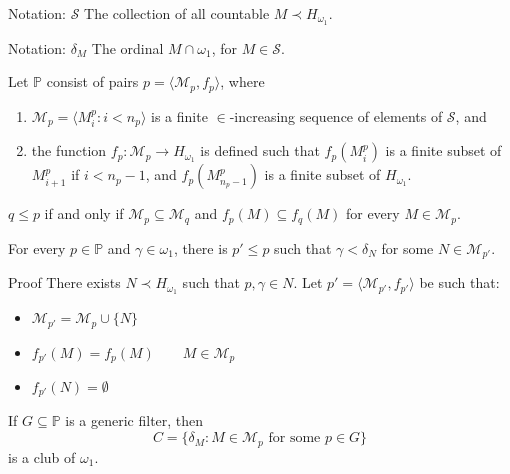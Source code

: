\documentclass{beamer}
\begin{document}
\begin{frame}
\begin{block}{Notation: $\mathcal{S}$ }
The collection of all countable $M \prec H_{\omega_1}$.
\end{block}
\pause
\begin{block}{Notation: $\delta_M$}
The ordinal $M \cap \omega_1$, for $M \in \mathcal{S}$.
\end{block}
\pause
\begin{block}{}
Let  $\mathbb{P}$ consist of pairs $p=\langle \mathcal{M}_p, f_p \rangle$, where
\begin{enumerate}
\item
$\mathcal{M}_p= \langle M^p_i: i < n_p  \rangle$ is a finite $\in$-increasing sequence of elements of $\mathcal{S}$, and
\pause
\item
the function $f_p: \mathcal{M}_p \longrightarrow H_{\omega_1}$ is defined such that $f_p(M^p_i)$ is a finite subset of $M^p_{i+1}$ if $i<n_p-1$, and $f_p(M^p_{n_p-1})$ is a finite subset of $H_{\omega_1}$.
\end{enumerate}
\pause
$q \leq p$ if and only if $\mathcal{M}_p \subseteq \mathcal{M}_q$ and $f_p(M) \subseteq f_q(M)$ for every $M \in \mathcal{M}_p$.
\end{block}
\end{frame}
\begin{frame}
\begin{lemma}
For every $p \in \mathbb{P}$ and $\gamma \in \omega_1$, there is  $p' \leq p$ such that $\gamma < \delta_{N}$ for some $N \in \mathcal{M}_{p'}$.
\end{lemma}
\pause
\begin{block}{Proof}
There exists $N \prec H_{\omega_1}$ such that $p, {\gamma} \in N$. Let $p'=\langle \mathcal{M}_{p'}, f_{p'} \rangle$ be such that:
\begin{itemize}
\item
$\mathcal{M}_{p'}= \mathcal{M}_p \cup \{N\}$
\item
$f_{p'}(M)=f_p(M) \qquad M \in \mathcal{M}_p$
\item 
$f_{p'}(N)=\emptyset$
\end{itemize}
\end{block}
\pause
\begin{Lemma}
If $G \subseteq \mathbb{P}$ is a generic filter, then $$C=\{\delta_M \colon M \in \mathcal{M}_p \text{ for some } p \in G \}$$ is a club
of $\omega_1$.
\end{Lemma}
\end{frame}
\end{document}
